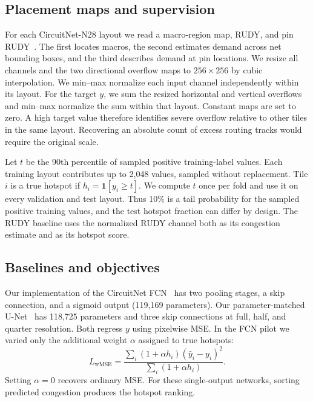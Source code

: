 \IfFileExists{./ieeeconf.cls}{\documentclass[9pt]{ieeeconf}}{\documentclass[conference]{IEEEtran}\usepackage[T1]{fontenc}}
\begin{document}
\subsection{Placement maps and supervision}
For each CircuitNet-N28 layout we read a macro-region map, RUDY, and pin RUDY~\cite{chai2022circuitnet,chai2023circuitnet}. The first locates macros, the second estimates demand across net bounding boxes, and the third describes demand at pin locations. We resize all channels and the two directional overflow maps to $256\times256$ by cubic interpolation. We min--max normalize each input channel independently within its layout. For the target $y$, we sum the resized horizontal and vertical overflows and min--max normalize the sum within that layout. Constant maps are set to zero. A high target value therefore identifies severe overflow relative to other tiles in the same layout. Recovering an absolute count of excess routing tracks would require the original scale.

Let $t$ be the 90th percentile of sampled positive training-label values. Each training layout contributes up to 2,048 values, sampled without replacement. Tile $i$ is a true hotspot if $h_i=\mathbf{1}[y_i\geq t]$. We compute $t$ once per fold and use it on every validation and test layout. Thus 10\% is a tail probability for the sampled positive training values, and the test hotspot fraction can differ by design. The RUDY baseline uses the normalized RUDY channel both as its congestion estimate and as its hotspot score.

\subsection{Baselines and objectives}
Our implementation of the CircuitNet FCN~\cite{liu2021global,chai2023circuitnet} has two pooling stages, a skip connection, and a sigmoid output (119,169 parameters). Our parameter-matched U-Net~\cite{ronneberger2015unet} has 118,725 parameters and three skip connections at full, half, and quarter resolution. Both regress $y$ using pixelwise MSE. In the FCN pilot we varied only the additional weight $\alpha$ assigned to true hotspots:
\begin{equation}
  L_{\mathrm{wMSE}} =
  \frac{\sum_i (1+\alpha h_i)(\hat y_i-y_i)^2}{\sum_i (1+\alpha h_i)}.
\end{equation}
Setting $\alpha=0$ recovers ordinary MSE. For these single-output networks, sorting predicted congestion produces the hotspot ranking.
\end{document}
